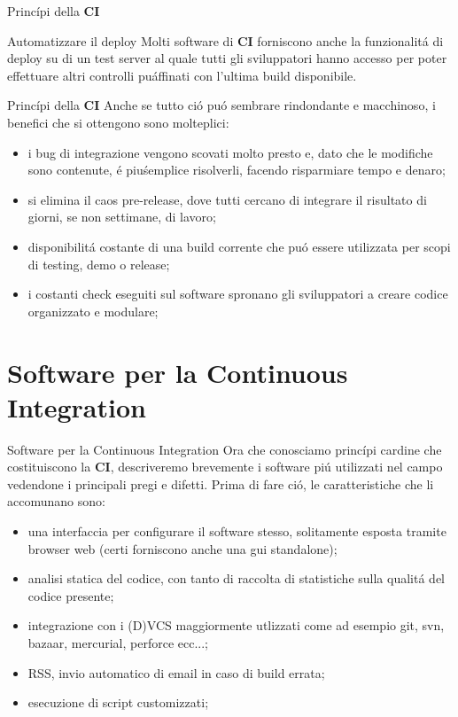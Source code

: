 \documentclass{beamer}
\begin{document}
\begin{frame}{Princ\'ipi della \textbf{CI}}
\begin{block}{Automatizzare il deploy}
Molti software di \textbf{CI} forniscono anche la funzionalit\'a di deploy su di un test server al quale tutti gli sviluppatori hanno
accesso per poter effettuare altri controlli pu\' affinati con l'ultima build disponibile.
\end{block}
\end{frame}

\begin{frame}{Princ\'ipi della \textbf{CI}}
Anche se tutto ci\'o pu\'o sembrare rindondante e macchinoso, i benefici che si ottengono sono molteplici:
\begin{itemize}
\item i bug di integrazione vengono scovati molto presto e, dato che le modifiche sono contenute, \'e piu\' semplice risolverli,
facendo risparmiare tempo e denaro;
\item si elimina il caos pre-release, dove tutti cercano di integrare il risultato di giorni, se non settimane, di lavoro;
\item disponibilit\'a costante di una build corrente che pu\'o essere utilizzata per scopi di testing, demo o release;
\item i costanti check eseguiti sul software spronano gli sviluppatori a creare codice organizzato e modulare;
\end{itemize}
\end{frame}


\section{Software per la Continuous Integration}
\begin{frame}{Software per la Continuous Integration}
Ora che conosciamo princ\'ipi cardine che costituiscono la \textbf{CI}, descriveremo brevemente i software pi\'u utilizzati nel
campo vedendone i principali pregi e difetti. Prima di fare ci\'o, le caratteristiche che li accomunano sono:
\begin{itemize}
\item una interfaccia per configurare il software stesso, solitamente esposta tramite browser web (certi forniscono anche una gui
standalone);
\item analisi statica del codice, con tanto di raccolta di statistiche sulla qualit\'a del codice presente;
\item integrazione con i (D)VCS maggiormente utlizzati come ad esempio git, svn, bazaar, mercurial, perforce ecc...;
\item RSS, invio automatico di email in caso di build errata;
\item esecuzione di script customizzati;
\end{itemize}
\end{frame}
\end{document}
